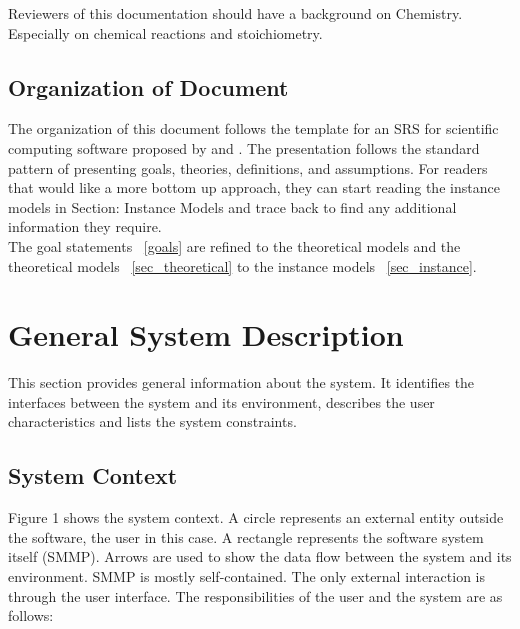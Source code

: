 \documentclass[12pt]{article}
\begin{document}
Reviewers of this documentation should have a background on Chemistry. Especially on chemical reactions and stoichiometry.

\subsection{Organization of Document}

The organization of this document follows the template for an SRS for scientific computing software proposed by \cite{Parnas1972}
and \cite{ParnasEtAl1984}. The presentation follows the standard pattern of presenting goals, theories, definitions, and assumptions. For readers that would like a more bottom up approach, they can start reading the instance models in Section: Instance Models and trace back to find any additional information they require. \\
The goal statements ~\ref{goals} are refined to the theoretical models and the theoretical models ~\ref{sec_theoretical} to the instance models  ~\ref{sec_instance}. 

\section{General System Description}

This section provides general information about the system.  It identifies the
interfaces between the system and its environment, describes the user
characteristics and lists the system constraints.  

\subsection{System Context}

Figure 1 shows the system context. A circle represents an external entity outside the
software, the user in this case. A rectangle represents the software system itself (SMMP).
Arrows are used to show the data flow between the system and its environment.
SMMP is mostly self-contained. The only external interaction is through the user interface. The responsibilities of the user and the system are as follows:
\end{document}
